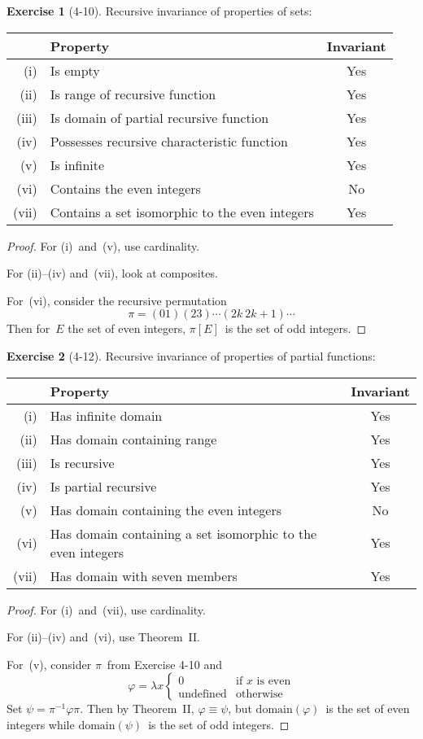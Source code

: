\documentclass[letterpaper]{article}
\newcommand{\iso}{\equiv}
\newcommand{\dom}{\mathrm{domain}}
\theoremstyle{definition}
\newtheorem*{exer}{Exercise}
\theoremstyle{remark}
\theoremstyle{direction}
\begin{document}
\begin{exer}[4-10]
Recursive invariance of properties of sets:
\begin{center}
\begin{tabular}{|rl|c|}
\hline
&\textbf{Property}&\textbf{Invariant}\\
\hline
(i)&Is empty&Yes\\
(ii)&Is range of recursive function&Yes\\
(iii)&Is domain of partial recursive function&Yes\\
(iv)&Possesses recursive characteristic function&Yes\\
(v)&Is infinite&Yes\\
(vi)&Contains the even integers&No\\
(vii)&Contains a set isomorphic to the even integers&Yes\\
\hline
\end{tabular}
\end{center}
\end{exer}
\begin{proof}
For (i)~and~(v), use cardinality.

For (ii)--(iv) and~(vii), look at composites.

For~(vi), consider the recursive permutation
$$\pi=(01)(23)\cdots(2k\ 2k+1)\cdots$$
Then for~$E$ the set of even integers, $\pi[E]$~is the set of odd integers.
\end{proof}

\begin{exer}[4-12]
Recursive invariance of properties of partial functions:
\begin{center}
\begin{tabular}{|rl|c|}
\hline
&\textbf{Property}&\textbf{Invariant}\\
\hline
(i)&Has infinite domain&Yes\\
(ii)&Has domain containing range&Yes\\
(iii)&Is recursive&Yes\\
(iv)&Is partial recursive&Yes\\
(v)&Has domain containing the even integers&No\\
(vi)&Has domain containing a set isomorphic to the even integers&Yes\\
(vii)&Has domain with seven members&Yes\\
\hline
\end{tabular}
\end{center}
\end{exer}
\begin{proof}
For (i)~and~(vii), use cardinality.

For (ii)--(iv) and~(vi), use Theorem~II.

For~(v), consider $\pi$~from Exercise 4-10 and
$$\varphi=\lambda x\begin{cases}
0&\text{if }x\text{ is even}\\
\text{undefined}&\text{otherwise}
\end{cases}$$
Set $\psi=\pi^{-1}\varphi\pi$. Then by Theorem~II, $\varphi\iso\psi$, but $\dom(\varphi)$~is the set of even integers while $\dom(\psi)$~is the set of odd integers.
\end{proof}
\end{document}
